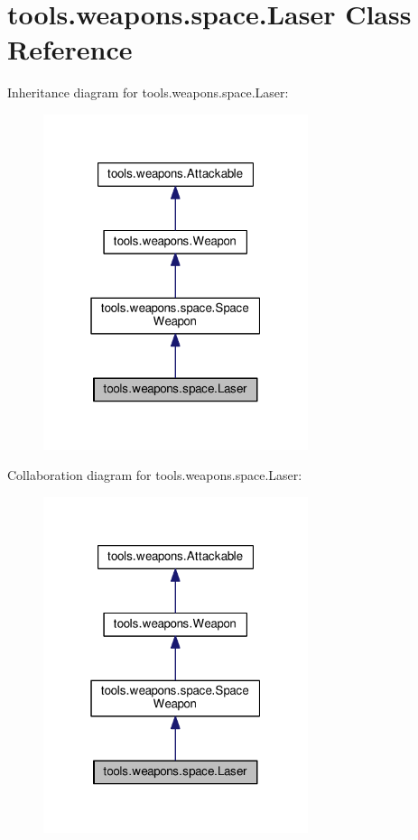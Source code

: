 \hypertarget{classtools_1_1weapons_1_1space_1_1_laser}{}\section{tools.\+weapons.\+space.\+Laser Class Reference}
\label{classtools_1_1weapons_1_1space_1_1_laser}


Inheritance diagram for tools.\+weapons.\+space.\+Laser\+:\nopagebreak
\begin{figure}[H]
\begin{center}
\leavevmode
\includegraphics[width=220pt]{classtools_1_1weapons_1_1space_1_1_laser__inherit__graph}
\end{center}
\end{figure}


Collaboration diagram for tools.\+weapons.\+space.\+Laser\+:\nopagebreak
\begin{figure}[H]
\begin{center}
\leavevmode
\includegraphics[width=220pt]{classtools_1_1weapons_1_1space_1_1_laser__coll__graph}
\end{center}
\end{figure}
